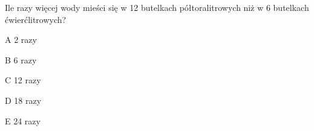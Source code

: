 \begin{tresc}
Ile razy więcej wody mieści się w 12 butelkach półtoralitrowych niż w 6 butelkach ćwierćlitrowych?
\end{tresc}
\begin{wariant}{A} 2 razy \end{wariant}
\begin{wariant}{B} 6 razy \end{wariant}
\begin{wariant}{C} 12 razy \end{wariant}
\begin{wariant}{D} 18 razy \end{wariant}
\begin{wariant}{E} 24 razy \end{wariant}
